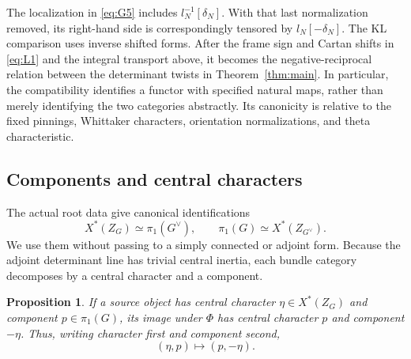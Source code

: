 \documentclass[11pt]{article}
\numberwithin{equation}{section}
\newtheorem{proposition}[theorem]{Proposition}
\theoremstyle{definition}
\theoremstyle{remark}
\begin{document}
The localization in \eqref{eq:G5} includes
\(l_N^{-1}[\delta_N]\).  With that last normalization removed, its
right-hand side is correspondingly tensored by \(l_N[-\delta_N]\).
The KL comparison uses inverse shifted forms.  After the frame sign and
Cartan shifts in \eqref{eq:L1} and the integral transport above, it
becomes the negative-reciprocal relation between the determinant twists
in Theorem~\ref{thm:main}.  In particular, the compatibility identifies
a functor with specified natural maps, rather than merely identifying
the two categories abstractly.  Its canonicity is relative to the fixed
pinnings, Whittaker characters, orientation normalizations, and theta
characteristic.

\subsection{Components and central characters}

The actual root data give canonical identifications
\[
 X^*(Z_G)\simeq\pi_1(G^\vee),\qquad
 \pi_1(G)\simeq X^*(Z_{G^\vee}).
\]
We use them without passing to a simply connected or adjoint form.
Because the adjoint determinant line has trivial central inertia,
each bundle category decomposes by a central character and a component.

\begin{proposition}\label{equivalence:sectors}
If a source object has central character
\(\eta\in X^*(Z_G)\) and component \(p\in\pi_1(G)\), its image
under \(\Phi\) has central character \(p\) and component \(-\eta\).
Thus, writing character first and component second,
\begin{equation}\label{eq:G6}
 (\eta,p)\longmapsto(p,-\eta).
\end{equation}
\end{proposition}
\end{document}
